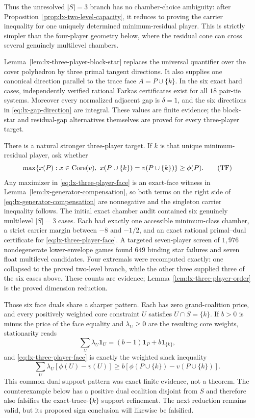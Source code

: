 Thus the unresolved $|S|=3$ branch has no chamber-choice ambiguity: after
Proposition~\ref{prop:lx-two-level-capacity}, it reduces to proving the carrier
inequality for one uniquely determined minimum-residual player.  This is
strictly simpler than the four-player geometry below, where the residual cone
can cross several genuinely multilevel chambers.

Lemma~\ref{lem:lx-three-player-block-star} replaces the universal quantifier
over the cover polyhedron by three primal tangent directions.  It also supplies
one canonical direction parallel to the trace face $A=P\cup\{k\}$.  In the six
exact hard cases, independently verified rational Farkas certificates exist
for all $18$ pair-tie systems.  Moreover every normalized adjacent gap is
$\delta=1$, and the six directions in \eqref{eq:lx-gap-direction} are integral.
These values are finite evidence; the block-star and residual-gap alternatives
themselves are proved for every three-player target.

There is a natural stronger three-player target.  If $k$ is that unique
minimum-residual player, ask whether
\[
 \max\{x(P):x\in\core(v),\ x(P\cup\{k\})=v(P\cup\{k\})\}
 \geq\phi(P).                                      \tag{TF}
 \label{eq:lx-three-player-face}
\]
Any maximizer in \eqref{eq:lx-three-player-face} is an exact-face witness in
Lemma~\ref{lem:lx-generator-compensation}, so both terms on the right side of
\eqref{eq:lx-generator-compensation} are nonnegative and the singleton carrier
inequality follows.  The initial exact chamber audit contained six
genuinely multilevel $|S|=3$ cases.  Each had exactly one accessible
minimum-class chamber, a strict carrier margin between $-8$ and $-1/2$, and
an exact rational primal--dual certificate for \eqref{eq:lx-three-player-face}.
A targeted seven-player screen of $1{,}976$ nondegenerate lower-envelope games
found $649$ binding star failures and seven float multilevel candidates.  Four
extremals were recomputed exactly: one collapsed to the proved two-level
branch, while the other three supplied three of the six cases above.  These
counts are evidence; Lemma~\ref{lem:lx-three-player-order} is the proved
dimension reduction.

Those six face duals share a sharper pattern.  Each has zero grand-coalition
price, and every positively weighted core constraint $U$ satisfies
$U\cap S=\{k\}$.  If $b>0$ is minus the price of the face equality and
$\lambda_U\geq0$ are the resulting core weights, stationarity reads
\[
 \sum_U\lambda_U\mathbf1_U
 =(b-1)\mathbf1_P+b\mathbf1_{\{k\}},
\]
and \eqref{eq:lx-three-player-face} is exactly the weighted slack inequality
\[
 \sum_U\lambda_U[\phi(U)-v(U)]
 \geq b[\phi(P\cup\{k\})-v(P\cup\{k\})].       \tag{TS}
 \label{eq:lx-three-player-slack-dual}
\]
This common dual support pattern was exact finite evidence, not a theorem.
The counterexample below has a positive dual coalition disjoint from $S$ and
therefore also falsifies the exact-trace-$\{k\}$ support refinement.  The next
reduction remains valid, but its proposed sign conclusion will likewise be
falsified.

